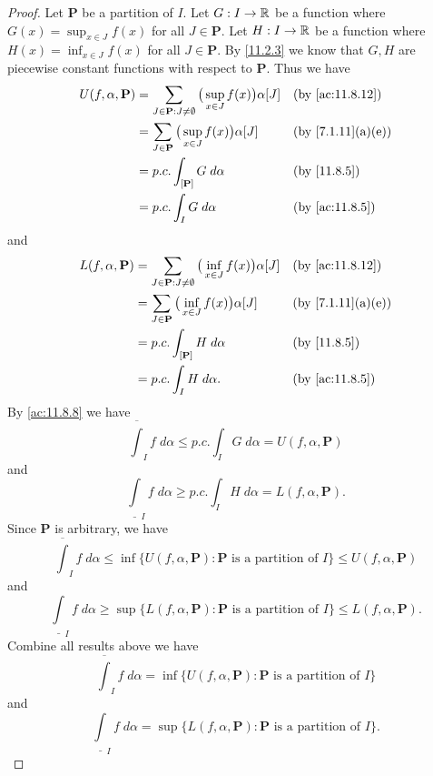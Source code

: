 \begin{proof}
  Let \(\mathbf{P}\) be a partition of \(I\).
  Let \(G : I \to \mathbb{R}\) be a function where \(G(x) = \sup_{x \in J} f(x)\) for all \(J \in \mathbf{P}\).
  Let \(H : I \to \mathbb{R}\) be a function where \(H(x) = \inf_{x \in J} f(x)\) for all \(J \in \mathbf{P}\).
  By \cref{11.2.3} we know that \(G, H\) are piecewise constant functions with respect to \(\mathbf{P}\).
  Thus we have
  \begin{align*}
    U(f, \alpha, \mathbf{P}) & = \sum_{J \in \mathbf{P} : J \neq \emptyset} \big(\sup_{x \in J} f(x)\big) \alpha[J] &  & \text{(by \cref{ac:11.8.12})}   \\
                             & = \sum_{J \in \mathbf{P}} \big(\sup_{x \in J} f(x)\big) \alpha[J]                    &  & \text{(by \cref{7.1.11}(a)(e))} \\
                             & = p.c. \int_{[\mathbf{P}]} G \; d \alpha                                             &  & \text{(by \cref{11.8.5})}       \\
                             & = p.c. \int_I G \; d \alpha                                                          &  & \text{(by \cref{ac:11.8.5})}
  \end{align*}
  and
  \begin{align*}
    L(f, \alpha, \mathbf{P}) & = \sum_{J \in \mathbf{P} : J \neq \emptyset} \big(\inf_{x \in J} f(x)\big) \alpha[J] &  & \text{(by \cref{ac:11.8.12})}   \\
                             & = \sum_{J \in \mathbf{P}} \big(\inf_{x \in J} f(x)\big) \alpha[J]                    &  & \text{(by \cref{7.1.11}(a)(e))} \\
                             & = p.c. \int_{[\mathbf{P}]} H \; d \alpha                                             &  & \text{(by \cref{11.8.5})}       \\
                             & = p.c. \int_I H \; d \alpha.                                                         &  & \text{(by \cref{ac:11.8.5})}
  \end{align*}
  By \cref{ac:11.8.8} we have
  \[
    \overline{\int}_I f \; d \alpha \leq p.c. \int_I G \; d \alpha = U(f, \alpha, \mathbf{P})
  \]
  and
  \[
    \underline{\int}_I f \; d \alpha \geq p.c. \int_I H \; d \alpha = L(f, \alpha, \mathbf{P}).
  \]
  Since \(\mathbf{P}\) is arbitrary, we have
  \[
    \overline{\int}_I f \; d \alpha \leq \inf\big\{U(f, \alpha, \mathbf{P}) : \mathbf{P} \text{ is a partition of } I\big\} \leq U(f, \alpha, \mathbf{P})
  \]
  and
  \[
    \underline{\int}_I f \; d \alpha \geq \sup\big\{L(f, \alpha, \mathbf{P}) : \mathbf{P} \text{ is a partition of } I\big\} \leq L(f, \alpha, \mathbf{P}).
  \]
  Combine all results above we have
  \[
    \overline{\int}_I f \; d \alpha = \inf\big\{U(f, \alpha, \mathbf{P}) : \mathbf{P} \text{ is a partition of } I\big\}
  \]
  and
  \[
    \underline{\int}_I f \; d \alpha = \sup\big\{L(f, \alpha, \mathbf{P}) : \mathbf{P} \text{ is a partition of } I\big\}.
  \]
\end{proof}


